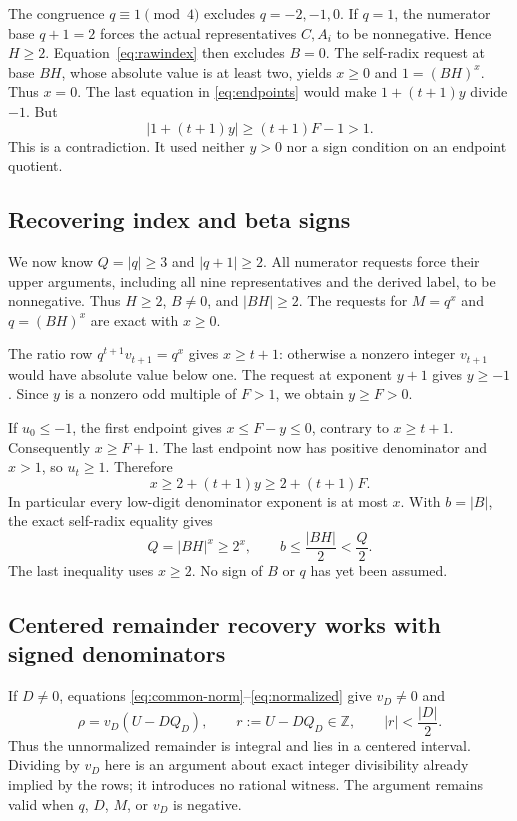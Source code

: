 \documentclass[11pt]{article}
\newcommand{\Z}{\mathbb Z}
\theoremstyle{remark}\newtheorem{remark}[theorem]{Remark}
\begin{document}
The congruence $q\equiv1\pmod4$ excludes $q=-2,-1,0$.
If $q=1$, the numerator base $q+1=2$ forces the actual representatives
$C,A_i$ to be nonnegative. Hence $H\ge2$.
Equation~\eqref{eq:rawindex} then excludes $B=0$.
The self-radix request at base $BH$, whose absolute value is at least
two, yields $x\ge0$ and $1=(BH)^x$. Thus $x=0$.
The last equation in \eqref{eq:endpoints} would make
$1+(t+1)y$ divide $-1$. But
\[
 |1+(t+1)y|\ge(t+1)F-1>1.
\]
This is a contradiction. It used neither $y>0$ nor a sign condition
on an endpoint quotient.

\subsection{Recovering index and beta signs}

We now know $Q=|q|\ge3$ and $|q+1|\ge2$.
All numerator requests force their upper arguments, including all nine
representatives and the derived label, to be nonnegative.
Thus $H\ge2$, $B\ne0$, and $|BH|\ge2$.
The requests for $M=q^x$ and $q=(BH)^x$ are exact with $x\ge0$.

The ratio row $q^{t+1}v_{t+1}=q^x$ gives $x\ge t+1$:
otherwise a nonzero integer $v_{t+1}$ would have absolute value below one.
The request at exponent $y+1$ gives $y\ge-1$.
Since $y$ is a nonzero odd multiple of $F>1$, we obtain $y\ge F>0$.

If $u_0\le-1$, the first endpoint gives $x\le F-y\le0$,
contrary to $x\ge t+1$. Consequently $x\ge F+1$.
The last endpoint now has positive denominator and $x>1$, so $u_t\ge1$.
Therefore
\begin{equation}\label{eq:budget}
 x\ge2+(t+1)y\ge2+(t+1)F.
\end{equation}
In particular every low-digit denominator exponent is at most $x$.
With $b=|B|$, the exact self-radix equality gives
\begin{equation}\label{eq:qsize}
 Q=|BH|^x\ge2^x,
 \qquad b\le\frac{|BH|}{2}<\frac Q2.
\end{equation}
The last inequality uses $x\ge2$. No sign of $B$ or $q$ has yet
been assumed.

\subsection{Centered remainder recovery works with signed denominators}

If $D\ne0$, equations \eqref{eq:common-norm}--\eqref{eq:normalized}
give $v_D\ne0$ and
\[
 \rho=v_D(U-DQ_D),\qquad r:=U-DQ_D\in\Z,
 \qquad |r|<\frac{|D|}{2}.
\]
Thus the unnormalized remainder is integral and lies in a centered
interval. Dividing by $v_D$ here is an argument about exact integer
divisibility already implied by the rows; it introduces no rational
witness. The argument remains valid when $q$, $D$, $M$, or $v_D$ is negative.
\end{document}
